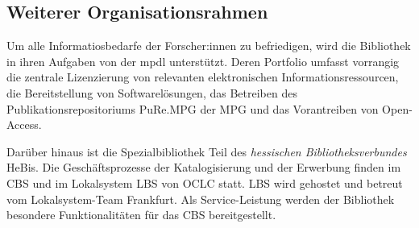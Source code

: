 \subsection{Weiterer Organisationsrahmen}
Um alle Informatiosbedarfe der Forscher:innen zu befriedigen, wird die Bibliothek in ihren Aufgaben von der
\acrfull{mpdl} unterstützt. Deren Portfolio umfasst vorrangig die zentrale 
Lizenzierung von relevanten elektronischen Informationsressourcen, die Bereitstellung von Softwarelösungen, 
das Betreiben des Publikationsrepositoriums \acrshort{PuRe.MPG} der \acrfull{MPG} und
das Vorantreiben von Open-Access. 

Darüber hinaus ist die Spezialbibliothek Teil des \textit{hessischen Bibliotheksverbundes} \acrshort{HeBis}. 
Die Geschäftsprozesse der Katalogisierung und der Erwerbung finden im \acrfull{CBS} und 
im Lokalsystem \acrfull{LBS} von \acrfull{OCLC} statt. \acrshort{LBS} wird gehostet und betreut vom Lokalsystem-Team Frankfurt. 
Als Service-Leistung werden der Bibliothek besondere Funktionalitäten für das \acrlong{CBS} bereitgestellt.


